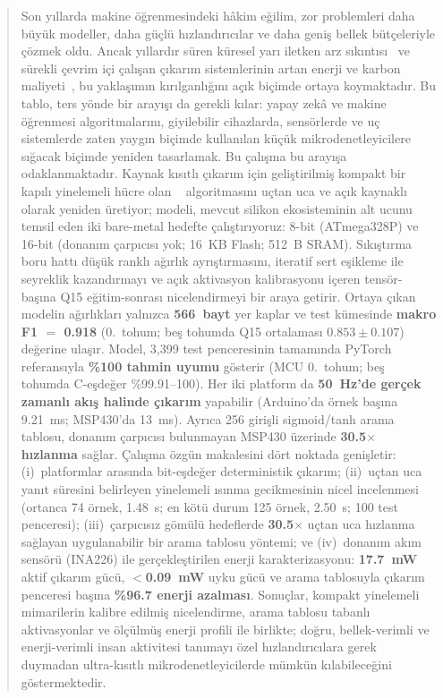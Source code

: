 \begin{abstract}
Son yıllarda makine öğrenmesindeki hâkim eğilim, zor problemleri
daha büyük modeller, daha güçlü hızlandırıcılar ve daha geniş bellek
bütçeleriyle çözmek oldu. Ancak yıllardır süren küresel yarı iletken
arz sıkıntısı~\cite{burkacky2022chipshortage,khan2021chipshortage}
ve sürekli çevrim içi çalışan çıkarım sistemlerinin artan enerji ve
karbon maliyeti~\cite{strubell2019energy,patterson2021carbon}, bu
yaklaşımın kırılganlığını açık biçimde ortaya koymaktadır. Bu tablo,
ters yönde bir arayışı da gerekli kılar: yapay zekâ ve makine
öğrenmesi algoritmalarını, giyilebilir cihazlarda, sensörlerde ve uç
sistemlerde zaten yaygın biçimde kullanılan küçük
mikrodenetleyicilere sığacak biçimde yeniden tasarlamak. Bu çalışma
bu arayışa odaklanmaktadır. Kaynak kısıtlı çıkarım için geliştirilmiş
kompakt bir kapılı yinelemeli hücre olan
\fastgrnn{}~\cite{kusupati2018fastgrnn} algoritmasını uçtan uca ve
açık kaynaklı olarak yeniden üretiyor; modeli, mevcut silikon
ekosisteminin alt ucunu temsil eden iki bare-metal hedefte
çalıştırıyoruz: 8-bit \arduino{} (ATmega328P) ve 16-bit \msp{}
(donanım çarpıcısı yok; 16~KB Flash; 512~B SRAM). Sıkıştırma
boru hattı düşük ranklı ağırlık ayrıştırmasını, iteratif sert
eşikleme ile seyreklik kazandırmayı ve açık aktivasyon kalibrasyonu
içeren tensör-başına Q15 eğitim-sonrası nicelendirmeyi bir araya
getirir. Ortaya çıkan modelin ağırlıkları yalnızca \textbf{566~bayt} yer
kaplar ve \hapt{} test kümesinde \textbf{makro F1 $=$ 0.918}
(0.~tohum; beş tohumda Q15 ortalaması $0.853{\pm}0.107$) değerine
ulaşır. Model, 3{,}399 test penceresinin tamamında PyTorch
referansıyla \textbf{\%100 tahmin uyumu} gösterir (MCU 0.~tohum;
beş tohumda C-eşdeğer \%99.91--100). Her iki platform da \textbf{50~Hz'de gerçek
zamanlı akış halinde çıkarım} yapabilir (Arduino'da örnek başına
9.21~ms; MSP430'da 13~ms). Ayrıca 256 girişli sigmoid/tanh arama
tablosu, donanım çarpıcısı bulunmayan MSP430 üzerinde
\textbf{30.5$\times$ hızlanma} sağlar. Çalışma özgün \fastgrnn{} makalesini dört noktada genişletir:
(i)~platformlar arasında bit-eşdeğer deterministik çıkarım;
(ii)~uçtan uca yanıt süresini belirleyen yinelemeli ısınma
gecikmesinin nicel incelenmesi (ortanca 74 örnek, 1.48~s;
en kötü durum 125 örnek, 2.50~s; 100 test penceresi);
(iii)~çarpıcısız gömülü hedeflerde \textbf{30.5$\times$} uçtan uca
hızlanma sağlayan uygulanabilir bir arama tablosu yöntemi; ve
(iv)~donanım akım sensörü (INA226) ile gerçekleştirilen enerji
karakterizasyonu: \textbf{17.7~mW} aktif çıkarım gücü,
\textbf{$<$0.09~mW} uyku gücü ve arama tablosuyla çıkarım penceresi
başına \textbf{\%96.7 enerji azalması}. Sonuçlar, kompakt yinelemeli
mimarilerin kalibre edilmiş nicelendirme, arama tablosu tabanlı
aktivasyonlar ve ölçülmüş enerji profili ile birlikte; doğru,
bellek-verimli ve enerji-verimli insan aktivitesi tanımayı özel
hızlandırıcılara gerek duymadan ultra-kısıtlı mikrodenetleyicilerde
mümkün kılabileceğini göstermektedir.
\end{abstract}
